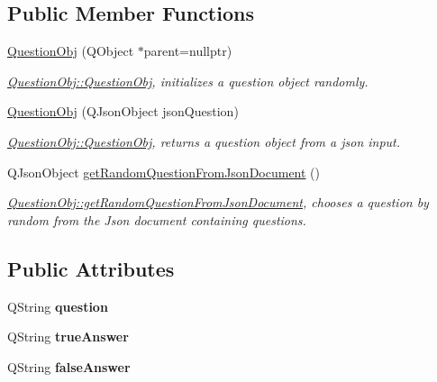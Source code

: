 \subsection*{Public Member Functions}
\begin{DoxyCompactItemize}
\item 
\hyperlink{classQuestionObj_a6bdcb5f15f07cd5552597e3b03408ef2}{Question\+Obj} (Q\+Object $\ast$parent=nullptr)
\begin{DoxyCompactList}\small\item\em \hyperlink{classQuestionObj_a6bdcb5f15f07cd5552597e3b03408ef2}{Question\+Obj\+::\+Question\+Obj}, initializes a question object randomly. \end{DoxyCompactList}\item 
\hyperlink{classQuestionObj_a32bd699d1cdea35e8d2db5fd1c329479}{Question\+Obj} (Q\+Json\+Object json\+Question)
\begin{DoxyCompactList}\small\item\em \hyperlink{classQuestionObj_a6bdcb5f15f07cd5552597e3b03408ef2}{Question\+Obj\+::\+Question\+Obj}, returns a question object from a json input. \end{DoxyCompactList}\item 
Q\+Json\+Object \hyperlink{classQuestionObj_a0211af0ca0084c025f5793c27a83f172}{get\+Random\+Question\+From\+Json\+Document} ()
\begin{DoxyCompactList}\small\item\em \hyperlink{classQuestionObj_a0211af0ca0084c025f5793c27a83f172}{Question\+Obj\+::get\+Random\+Question\+From\+Json\+Document}, chooses a question by random from the Json document containing questions. \end{DoxyCompactList}\end{DoxyCompactItemize}
\subsection*{Public Attributes}
\begin{DoxyCompactItemize}
\item 
\mbox{\label{classQuestionObj_a15696c2ae2f9b7ee5bca14d17b844c6f}} 
Q\+String {\bfseries question}
\item 
\mbox{\label{classQuestionObj_a2d37f7f7d2aa7beed70ac10ac4d9b926}} 
Q\+String {\bfseries true\+Answer}
\item 
\mbox{\label{classQuestionObj_a329dcfdd9884aa21695fb0d791abf8e5}} 
Q\+String {\bfseries false\+Answer}
\end{DoxyCompactItemize}


